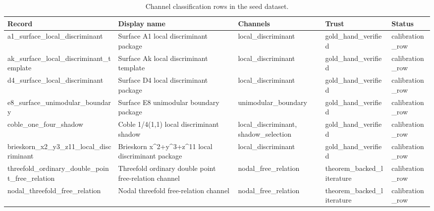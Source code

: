 \begin{table}[h]
\centering
\caption{Channel classification rows in the seed dataset.}
\label{tab:channel-table}
\footnotesize
\begin{tabular}{|p{}|p{}|p{}|p{}|p{}|}
\hline
Record & Display name & Channels & Trust & Status \\
\hline
a1\_\allowbreak{}surface\_\allowbreak{}local\_\allowbreak{}discriminant & Surface A1 local discriminant package & local\_\allowbreak{}discriminant & gold\_\allowbreak{}hand\_\allowbreak{}verified & calibration\_\allowbreak{}row \\
ak\_\allowbreak{}surface\_\allowbreak{}local\_\allowbreak{}discriminant\_\allowbreak{}template & Surface Ak local discriminant template & local\_\allowbreak{}discriminant & gold\_\allowbreak{}hand\_\allowbreak{}verified & calibration\_\allowbreak{}row \\
d4\_\allowbreak{}surface\_\allowbreak{}local\_\allowbreak{}discriminant & Surface D4 local discriminant package & local\_\allowbreak{}discriminant & gold\_\allowbreak{}hand\_\allowbreak{}verified & calibration\_\allowbreak{}row \\
e8\_\allowbreak{}surface\_\allowbreak{}unimodular\_\allowbreak{}boundary & Surface E8 unimodular boundary package & unimodular\_\allowbreak{}boundary & gold\_\allowbreak{}hand\_\allowbreak{}verified & calibration\_\allowbreak{}row \\
coble\_\allowbreak{}one\_\allowbreak{}four\_\allowbreak{}shadow & Coble 1/4(1,1) local discriminant shadow & local\_\allowbreak{}discriminant, shadow\_\allowbreak{}selection & gold\_\allowbreak{}hand\_\allowbreak{}verified & calibration\_\allowbreak{}row \\
brieskorn\_\allowbreak{}x2\_\allowbreak{}y3\_\allowbreak{}z11\_\allowbreak{}local\_\allowbreak{}discriminant & Brieskorn x\textasciicircum{}2+y\textasciicircum{}3+z\textasciicircum{}11 local discriminant package & local\_\allowbreak{}discriminant & gold\_\allowbreak{}hand\_\allowbreak{}verified & calibration\_\allowbreak{}row \\
threefold\_\allowbreak{}ordinary\_\allowbreak{}double\_\allowbreak{}point\_\allowbreak{}free\_\allowbreak{}relation & Threefold ordinary double point free-relation channel & nodal\_\allowbreak{}free\_\allowbreak{}relation & theorem\_\allowbreak{}backed\_\allowbreak{}literature & calibration\_\allowbreak{}row \\
nodal\_\allowbreak{}threefold\_\allowbreak{}free\_\allowbreak{}relation & Nodal threefold free-relation channel & nodal\_\allowbreak{}free\_\allowbreak{}relation & theorem\_\allowbreak{}backed\_\allowbreak{}literature & calibration\_\allowbreak{}row \\

\end{tabular}
\end{table}

